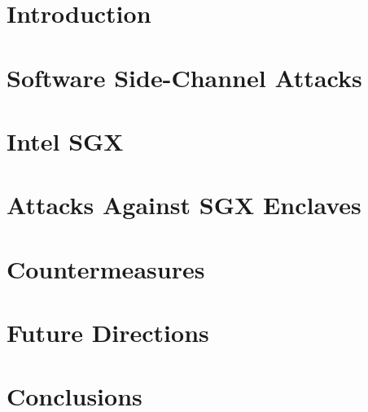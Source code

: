 \section{Introduction}

\section{Software Side-Channel Attacks}

\section{Intel SGX}

\section{Attacks Against SGX Enclaves}

\section{Countermeasures}

\section{Future Directions}

\section{Conclusions}
